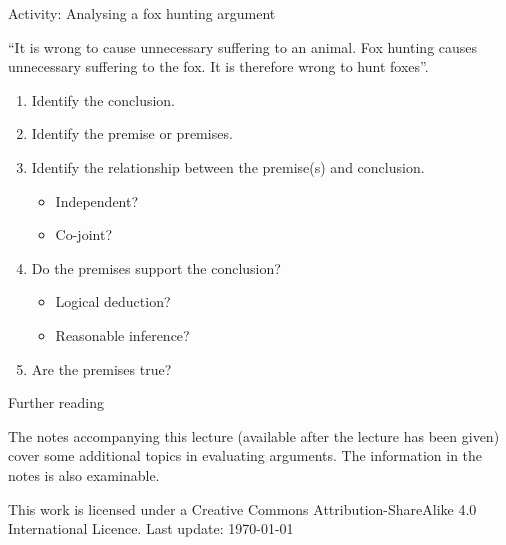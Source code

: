 \documentclass{beamer}
\begin{document}
\begin{frame}{Activity: Analysing a fox hunting argument}

``It is wrong to cause unnecessary suffering to an animal. Fox hunting causes unnecessary suffering to the fox. It is therefore wrong to hunt foxes''.

\begin{enumerate}
\item Identify the conclusion.
\item Identify the premise or premises.
\item Identify the relationship between the premise(s) and conclusion.
\begin{itemize}
\item Independent?
\item Co-joint?
\end{itemize}
\item Do the premises support the conclusion?
\begin{itemize}
\item Logical deduction?
\item Reasonable inference?
\end{itemize}
\item Are the premises true?
\end{enumerate}

\vspace{12pt}


\end{frame}

\begin{frame}{Further reading}

  The notes accompanying this lecture (available after the lecture has been given) cover some additional topics in evaluating arguments. The information in the notes is also examinable.

\end{frame}

\tiny
This work is licensed under a Creative Commons Attribution-ShareAlike
4.0 International Licence. Last update: \today
\end{document}
